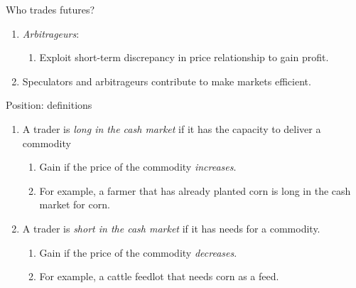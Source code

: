 \documentclass[table,xcolor=pdftex,dvipsnames]{beamer}\usepackage[]{graphicx}\usepackage[]{color}
\begin{document}

\begin{frame}{Who trades futures?}
\begin{enumerate}[label=\textbullet]
      \item \emph{Arbitrageurs}:
      \begin{enumerate}[label=-]
          \item Exploit short-term discrepancy in price relationship to gain profit.
       \end{enumerate}
      \item Speculators and arbitrageurs contribute to make markets efficient.
\end{enumerate}
\end{frame}


\begin{frame}{Position: definitions}
\begin{enumerate}[label=\textbullet]
      \item A trader is \emph{long in the cash market} if it has the capacity to deliver a commodity
       \begin{enumerate}[label=-]
           \item Gain if the price of the commodity \emph{increases}.
           \item For example, a farmer that has already planted corn is long in the cash market for corn.
       \end{enumerate}
      \item A trader is \emph{short in the cash market} if it has needs for a commodity.
        \begin{enumerate}[label=-]
           \item Gain if the price of the commodity \emph{decreases}.
           \item For example, a cattle feedlot that needs corn as a feed.
       \end{enumerate}
\end{enumerate}
\end{frame}


\end{document}
